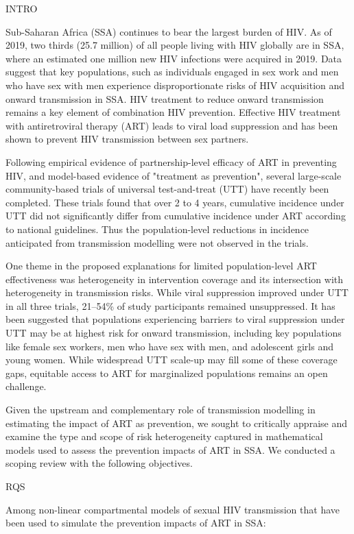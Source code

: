 

INTRO

Sub-Saharan Africa (SSA) continues to bear the largest burden of HIV.
As of 2019, two thirds (25.7 million) of all people living with HIV globally are in SSA, where
an estimated one million new HIV infections were acquired in 2019.
Data suggest that key populations, such as individuals engaged in sex work and men who have sex with men experience
disproportionate risks of HIV acquisition and onward transmission in SSA.
HIV treatment to reduce onward transmission remains a key element of combination HIV prevention.
Effective HIV treatment with antiretroviral therapy (ART) leads to viral load suppression
and has been shown to prevent HIV transmission between sex partners.

Following empirical evidence of partnership-level efficacy of ART
in preventing HIV,
and model-based evidence of "treatment as prevention",
several large-scale community-based trials of universal test-and-treat (UTT)
have recently been completed.
These trials found that over 2 to 4 years,
cumulative incidence under UTT did not significantly differ from
cumulative incidence under ART according to national guidelines.
Thus the population-level reductions in incidence anticipated from transmission modelling
were not observed in the trials.

One theme in the proposed explanations for limited population-level ART effectiveness
was heterogeneity in intervention coverage and its intersection with
heterogeneity in transmission risks.
While viral suppression improved under UTT in all three trials,
21--54\% of study participants remained unsuppressed.
It has been suggested that populations experiencing barriers to viral suppression under UTT
may be at highest risk for onward transmission, including key populations like
female sex workers, men who have sex with men, and adolescent girls and young women.
While widespread UTT scale-up may fill some of these coverage gaps,
equitable access to ART for marginalized populations remains an open challenge.

Given the upstream and complementary role of transmission modelling
in estimating the impact of ART as prevention,
we sought to critically appraise and examine the type and scope of risk heterogeneity captured
in mathematical models used to assess the prevention impacts of ART in SSA.
We conducted a scoping review with the following objectives.

RQS

Among non-linear compartmental models of sexual HIV transmission
that have been used to simulate the prevention impacts of ART in SSA:

